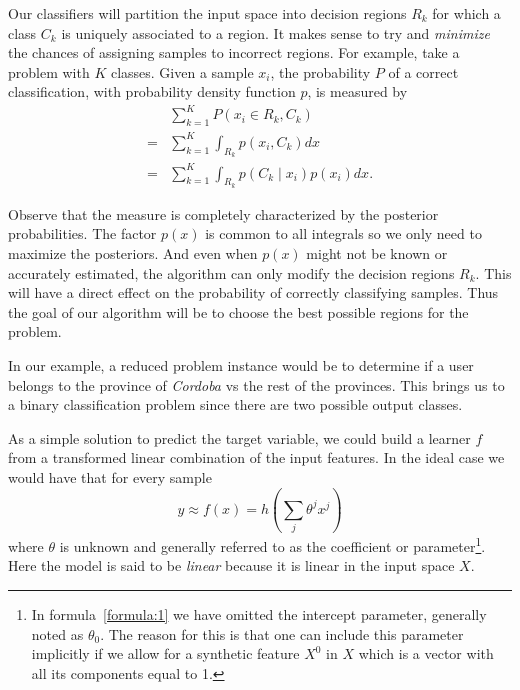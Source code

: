 Our classifiers will partition the input space into decision regions $R_k$ for which a class $C_k$ is uniquely associated to a region. It makes sense to try and \textit{minimize} the chances of assigning samples to incorrect regions. For example, take a problem with $K$ classes. Given a sample $x_i$, the probability $P$ of a correct classification, with probability density function $p$, is measured by
\begin{equation}\label{eq:goodclassification-equation}
\begin{split}
  & \sum_{k=1}^{K} P(x_i \in R_k, C_k ) \\
= & \sum_{k=1}^{K} \int_{R_k}p(x_i,C_k) dx \\
= & \sum_{k=1}^{K} \int_{R_k}p(C_k \mid x_i) p(x_i) dx .
\end{split}
\end{equation}

Observe that the measure is completely characterized by the posterior probabilities. The factor $p(x)$ is common to all integrals so we only need to maximize the posteriors. And even when $p(x)$ might not be known or accurately estimated, the algorithm can only modify the decision regions $R_k$. This will have a direct effect on the probability of correctly classifying samples. Thus the goal of our algorithm will be to choose the best possible regions for the problem.

In our example, a reduced problem instance would be to determine if a user belongs to the province of \textit{Cordoba} vs the rest of the provinces. This brings us to a binary classification problem since there are two possible output classes. %

As a simple solution to predict the target variable, we could build a learner $f$ from a transformed linear combination of the input features. In the ideal case we would have that for every sample
\begin{equation}\label{formula:1}
y \approx f(x) = h\left(\sum_{j}\theta^j x^j\right)
\end{equation}
where $\theta$ is unknown and generally referred to as the coefficient or parameter\footnote{In formula~\cref{formula:1} we have omitted the intercept parameter, generally noted as $\theta_0$. The reason for this is that one can include this parameter implicitly if we allow for a synthetic feature $X^0$ in $X$ which is a vector with all its components equal to 1.}. Here the model is said to be \textit{linear} because it is linear in the input space $X$.

